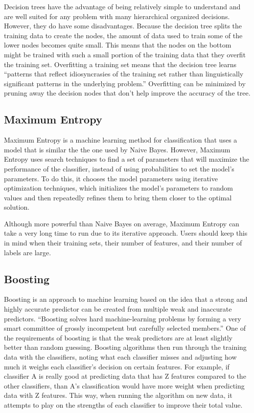 Decision trees have the advantage of being relatively simple to understand and are well suited for any problem with many hierarchical organized decisions. However, they do have some disadvantages. Because the decision tree splits the training data to create the nodes, the amount of data used to train some of the lower nodes becomes quite small. This means that the nodes on the bottom might be trained with such a small portion of the training data that they overfit the training set.\cite{NLTK} Overfitting a training set means that the decision tree learns ``patterns that reflect idiosyncrasies of the training set rather than linguistically significant patterns in the underlying problem.''\cite{NLTK} Overfitting can be minimized by pruning away the decision nodes that don't help improve the accuracy of the tree.

\subsection{Maximum Entropy}
Maximum Entropy is a machine learning method for classification that uses a model that is similar the the one used by Naive Bayes. However, Maximum Entropy uses search techniques to find a set of parameters that will maximize the performance of the classifier, instead of using probabilities to set the model's parameters. To do this, it chooses the model parameters using iterative optimization techniques, which initializes the model's parameters to random values and then repeatedly refines them to bring them closer to the optimal solution.\cite{NLTK}

Although more powerful than Naive Bayes on average, Maximum Entropy can take a very long time to run due to its iterative approach. Users should keep this in mind when their training sets, their number of features, and their number of labels are large.\cite{NLTK}

\subsection{Boosting}
Boosting is an approach to machine learning based on the idea that a strong and highly accurate predictor can be created from multiple weak and inaccurate predictors. ``Boosting solves hard machine-learning problems by forming a very smart committee of grossly incompetent but carefully selected members.'' \cite{boosting} One of the requirements of boosting is that the weak predictors are at least slightly better than random guessing. Boosting algorithms then run through the training data with the classifiers, noting what each classifier misses and adjusting how much it weighs each classifier's decision on certain features. For example, if classifier A is really good at predicting data that has Z features compared to the other classifiers, than A's classification would have more weight when predicting data with Z features. This way, when running the algorithm on new data, it attempts to play on the strengths of each classifier to improve their total value. 

